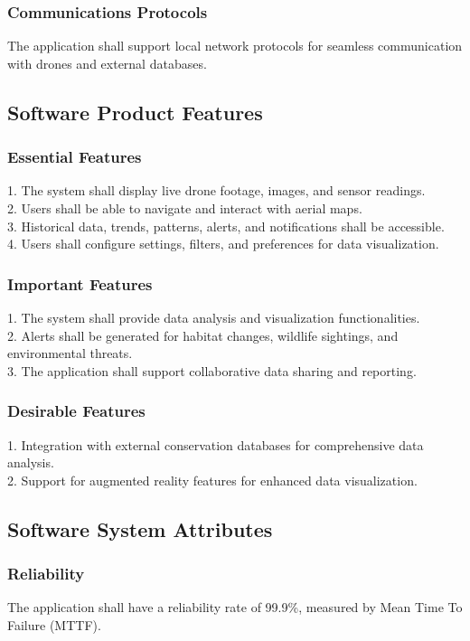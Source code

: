 \documentclass{article}
\begin{document}
\subsubsection{Communications Protocols}
The application shall support local network protocols for seamless communication with drones and external databases.

\subsection{Software Product Features}

\subsubsection{Essential Features}
1. The system shall display live drone footage, images, and sensor readings.\\
2. Users shall be able to navigate and interact with aerial maps.\\
3. Historical data, trends, patterns, alerts, and notifications shall be accessible.\\
4. Users shall configure settings, filters, and preferences for data visualization.

\subsubsection{Important Features}
1. The system shall provide data analysis and visualization functionalities.\\
2. Alerts shall be generated for habitat changes, wildlife sightings, and environmental threats.\\
3. The application shall support collaborative data sharing and reporting.

\subsubsection{Desirable Features}
1. Integration with external conservation databases for comprehensive data analysis.\\
2. Support for augmented reality features for enhanced data visualization.

\subsection{Software System Attributes}

\subsubsection{Reliability}
The application shall have a reliability rate of 99.9\%, measured by Mean Time To Failure (MTTF).
\end{document}
